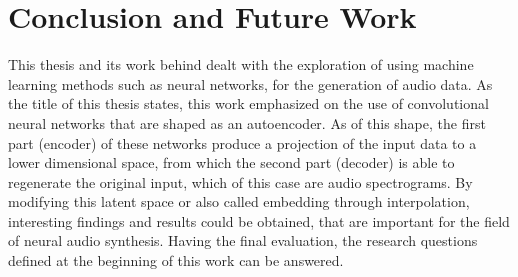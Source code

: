 \chapter{Conclusion and Future Work}
\label{cha:Conclusion}

This thesis and its work behind dealt with the exploration of using machine learning methods such as neural networks, for the generation of audio data. As the title of this thesis states, this work emphasized on the use of convolutional neural networks that are shaped as an autoencoder. As of this shape, the first part (encoder) of these networks produce a projection of the input data to a lower dimensional space, from which the second part (decoder) is able to regenerate the original input, which of this case are audio spectrograms. By modifying this latent space or also called embedding through interpolation, interesting findings and results could be obtained, that are important for the field of neural audio synthesis. Having the final evaluation, the research questions defined at the beginning of this work can be answered.

